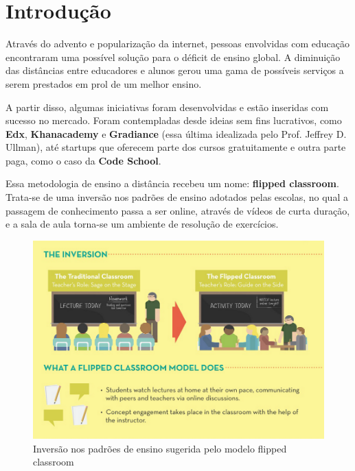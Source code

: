 \documentclass[graduacao,brazil]{ThesisPUC}
\begin{document}

\chapter{Introdu\c{c}\~{a}o}

Atrav\'{e}s do advento e populariza\c{c}\~{a}o da internet, pessoas envolvidas com educa\c{c}\~{a}o
encontraram uma poss\'{i}vel solu\c{c}\~{a}o para o d\'{e}ficit de ensino global. A diminui\c{c}\~{a}o
das dist\^{a}ncias entre educadores e alunos gerou uma gama de poss\'{i}veis servi\c{c}os a serem prestados
em prol de um melhor ensino.

A partir disso, algumas iniciativas foram desenvolvidas e est\~{a}o inseridas com sucesso no
mercado. Foram contempladas desde ideias sem fins lucrativos, como \textbf{Edx}, \textbf{Khanacademy} e
\textbf{Gradiance} (essa \'{u}ltima idealizada pelo Prof. Jeffrey D. Ullman), at\'{e} startups que oferecem
parte dos cursos gratuitamente e outra parte paga, como o caso da \textbf{Code School}.

Essa metodologia de ensino a dist\^{a}ncia recebeu um nome: \textbf{flipped classroom}. Trata-se de
uma invers\~{a}o nos padr\~{o}es de ensino adotados pelas escolas, no qual a passagem de
conhecimento passa a ser online, atrav\'{e}s de v\'{i}deos de curta dura\c{c}\~{a}o, e a sala de aula torna-se
um ambiente de resolu\c{c}\~{a}o de exerc\'{i}cios.

\begin{figure}[H]
    \centering
    \includegraphics[width=\linewidth]{Imagens/flipped_classroom.png}
    \caption{Invers\~{a}o nos padr\~{o}es de ensino sugerida pelo modelo flipped classroom}
\end{figure}
\end{document}
